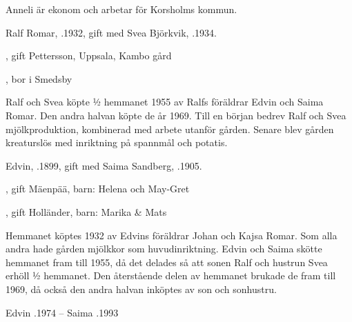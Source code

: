Anneli är ekonom och arbetar för Korsholms kommun.



Ralf Romar, .1932, gift med Svea Björkvik, .1934.
\begin{jhchildren}
  \item {}, gift Pettersson, Uppsala, Kambo gård
  \item {}, bor i Smedsby
\end{jhchildren}
Ralf och Svea köpte ½ hemmanet 1955 av Ralfs föräldrar Edvin och Saima Romar. Den andra halvan köpte de  år 1969. Till en början bedrev Ralf och Svea mjölkproduktion, kombinerad med arbete utanför gården. Senare blev gården kreaturslös med inriktning på spannmål och potatis.


Edvin, .1899, gift med Saima Sandberg, .1905.

\begin{jhchildren}
  \item {}, gift Mäenpää, barn: Helena och May-Gret
  \item {}
  \item {}, gift Holländer, barn: Marika \& Mats
\end{jhchildren}

Hemmanet köptes  1932  av Edvins föräldrar Johan och Kajsa Romar. Som alla andra hade gården mjölkkor som huvudinriktning. Edvin och Saima skötte hemmanet fram till 1955, då det delades så att sonen Ralf och hustrun Svea erhöll ½ hemmanet.  Den återstående delen av hemmanet brukade de fram till 1969, då också den andra halvan inköptes av son och sonhustru.

Edvin .1974  --  Saima .1993


